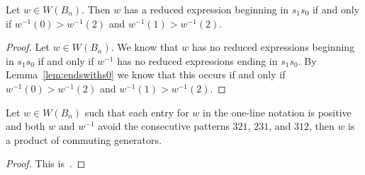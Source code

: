 \begin{corollary}\label{lem:beginswiths1}
	Let $w \in W(B_n)$. Then $w$ has a reduced expression beginning in $s_1s_0$ if and only if $w^{-1}(0)>w^{-1}(2)$ and $w^{-1}(1)>w^{-1}(2)$.
	\begin{proof}
		Let $w \in W(B_n)$. We know that $w$ has no reduced expressions beginning in $s_1s_0$ if and only if $w^{-1}$ has no reduced expressions ending in $s_1s_0$. By Lemma~\ref{lem:endswiths0} we know that this occurs if and only if $w^{-1}(0)>w^{-1}(2)$ and $w^{-1}(1)>w^{-1}(2)$.
	\end{proof}
\end{corollary}

\begin{lemma}\label{lem:prodofcommA}
Let $w \in W(B_n)$ such that each entry for $w$ in the one-line notation is positive and both $w$ and $w^{-1}$ avoid the consecutive patterns $321$, $231$, and $312$, then $w$ is a product of commuting generators.
\begin{proof}
	This is~\cite[Lemma 2.2.9]{Gern2013a}.
\end{proof}	
\end{lemma}

